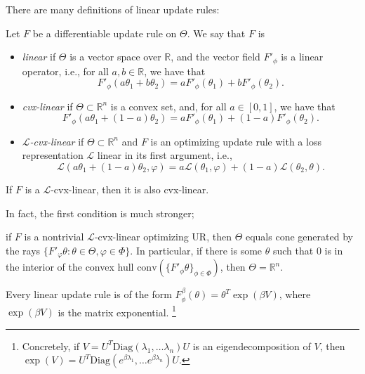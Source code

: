 \documentclass{article}
\begin{document}
There are many definitions of linear update rules:
\begin{defn}\label{ax:linear}
Let $F$ be a differentiable update rule on $\Theta$. We say that $F$ is \textellipsis
\begin{itemize}
    \item \emph{linear} if $\Theta$ is a vector space over $\mathbb R$, and the
    vector field $F'_\phi$ is a linear operator, i.e., for all $a, b \in \mathbb R$, we have that
    \[ F'_\phi(a \theta_1 + b \theta_2) = a F'_\phi(\theta_1) + b F'_\phi(\theta_2). \]

    \item \emph{cvx-linear} if $\Theta \subset \mathbb R^n$ is a convex set, and, for all $a \in [0,1]$, we have that
    \[ F'_\phi(a \theta_1 + (1-a) \theta_2) = a F'_\phi(\theta_1) + (1-a) F'_\phi(\theta_2). \]

    \item \emph{$\mathcal L$-cvx-linear} if $\Theta \subset \mathbb R^n$ and $F$ is an optimizing update rule with a loss representation $\mathcal L$ linear in its first argument, i.e.,
    \[
        \mathcal L(a \theta_1 + (1-a) \theta_2, \varphi) = a \mathcal L(\theta_1, \varphi) + (1-a) \mathcal L(\theta_2, \theta).
    \]
\end{itemize}
\end{defn}

\begin{prop}
    If $F$ is a $\mathcal L$-cvx-linear, then it is also cvx-linear.
\end{prop}

In fact, the first condition is much stronger;
\begin{prop}
    if $F$ is a nontrivial $\mathcal L$-cvx-linear optimizing UR, then $\Theta$ equals cone generated by  the rays $\{ F'_\varphi\theta : \theta \in \Theta, \varphi \in \Phi \}$. In particular, if there is some $\theta$ such that $0$ is in the interior of the convex hull $\mathrm{conv}(\{F'_\phi\theta\}_{\phi \in \Phi})$, then $\Theta = \mathbb R^n$.
\end{prop}


\begin{prop}
    Every linear update rule is of the form
    $
        F^{\beta}_\phi(\theta) =  \theta^{T} \exp(\beta V)
    $,
    where $\exp(\beta V)$ is the matrix exponential.%
        \footnote{Concretely, if $V = U^T \mathrm{Diag}(\lambda_1, \ldots \lambda_n) U$ is an eigendecomposition of $V$, then $\exp(V) = U^T \mathrm{Diag}(e^{\beta\lambda_1}, \ldots e^{\beta\lambda_n}) U$.}
\end{prop}
\end{document}
